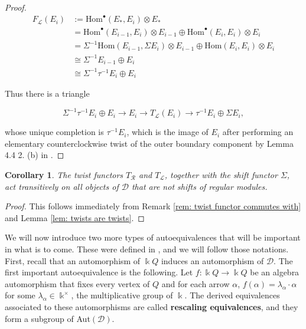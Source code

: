 \documentclass[12pt]{amsart}
\theoremstyle{plain}
\newtheorem{cor}[thm]{Corollary}
\theoremstyle{definition}
\theoremstyle{remark}
\begin{document}
\begin{proof}
\begin{align*}
F_{\mathscr{L}}(E_i) &:= \text{Hom}^{\bullet}(E_*,E_i)\otimes E_* \\
&= \text{Hom}^{\bullet}(E_{i-1},E_i) \otimes E_{i-1} \oplus \text{Hom}^{\bullet}(E_{i},E_i) \otimes E_{i}\\
&= \Sigma^{-1}\text{Hom}(E_{i-1},\Sigma E_i) \otimes E_{i-1} \oplus \text{Hom}(E_{i},E_i) \otimes E_{i} \\
&\cong \Sigma^{-1}E_{i-1} \oplus E_i\\ &\cong \Sigma^{-1}\tau^{-1} E_i \oplus E_i
\end{align*}

Thus there is a triangle 

$$\Sigma^{-1}\tau^{-1} E_i \oplus E_i \rightarrow E_i \rightarrow T_{\mathscr{L}}(E_i) \rightarrow \tau^{-1} E_i \oplus \Sigma E_i,$$

whose unique completion is $\tau^{-1} E_i$, which is the image of $E_{i}$ after performing an elementary  counterclockwise twist of the outer boundary component by Lemma 4.4 2. (b) in \cite{maresca2022combinatorics}.
\end{proof}

\begin{cor} \label{cor: twist functors act transitively}
The twist functors $T_{\mathcal{R}}$ and $T_{\mathcal{L}}$, together with the shift functor $\Sigma$, act transitively on all objects of $\mathscr{D}$ that are not shifts of regular modules.
\end{cor}

\begin{proof}
This follows immediately from Remark \ref{rem: twist functor commutes with} and Lemma \ref{lem: twists are twists}.
\end{proof}

We will now introduce two more types of autoequivalences that will be important in what is to come. These were defined in \cite{opper2019auto}, and we will follow those notations. First, recall that an automorphism of $\Bbbk Q$ induces an automorphism of $\mathscr{D}$. The first important autoequivalence is the following. Let $f: \Bbbk Q \rightarrow \Bbbk Q$ be an algebra automorphism that fixes every vertex of $Q$ and {\color{black} for each arrow $\alpha$,} $f(\alpha) = \lambda_{\alpha} \cdot \alpha$ for some $\lambda_{\alpha} \in \Bbbk^{\times}$, the multiplicative group of $\Bbbk$. The derived equivalences associated to these automorphisms are called \textbf{rescaling equivalences}, and they form a subgroup of Aut$(\mathscr{D})$.
\end{document}
